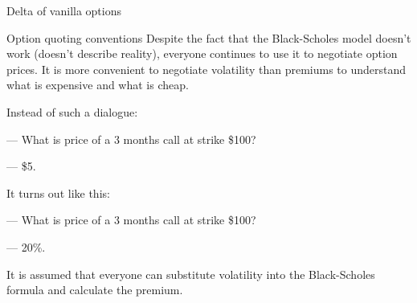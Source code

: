 \documentclass{beamer}
\begin{document}
\begin{frame}{Delta of vanilla options}
\centering
{}
\end{frame}



\begin{frame}{Option quoting conventions}
\justify
Despite the fact that the Black-Scholes model doesn't work (doesn't describe reality), everyone continues to use it to negotiate option prices. It is more convenient to negotiate volatility than premiums to understand what is expensive and what is cheap.

\justify
Instead of such a dialogue:

--- What is price of a 3 months call at strike \$100?

--- \$5.

\justify
It turns out like this:

--- What is price of a 3 months call at strike \$100?

--- 20\%.

\justify
It is assumed that everyone can substitute volatility into the Black-Scholes formula and calculate the premium.
\end{frame}
\end{document}
